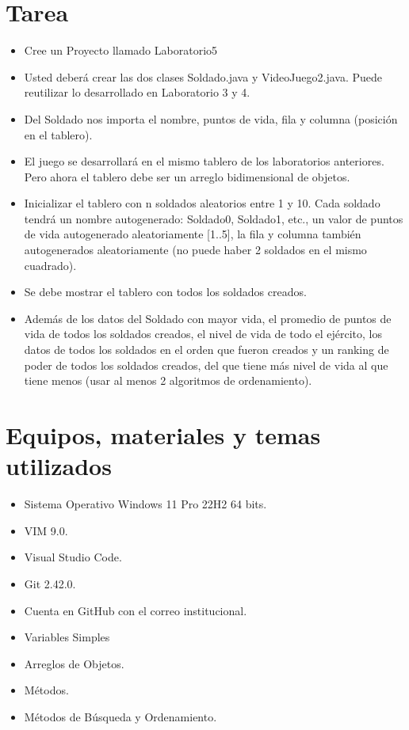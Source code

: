 \documentclass{article}
\begin{document}

	\section{Tarea}
	\begin{itemize}		
		\item Cree un Proyecto llamado Laboratorio5
        \item Usted deberá crear las dos clases Soldado.java y VideoJuego2.java. Puede reutilizar lo desarrollado en Laboratorio 3 y 4.
        \item Del Soldado nos importa el nombre, puntos de vida, fila y columna (posición en el tablero).
        \item El juego se desarrollará en el mismo tablero de los laboratorios anteriores. Pero ahora el tablero debe ser un arreglo bidimensional de objetos.
        \item Inicializar el tablero con n soldados aleatorios entre 1 y 10. Cada soldado tendrá un nombre autogenerado: Soldado0, Soldado1, etc., un valor de puntos de vida autogenerado aleatoriamente [1..5], la fila y columna también autogenerados aleatoriamente (no puede haber 2 soldados en el mismo cuadrado). 
        \item Se debe mostrar el tablero con todos los soldados creados. 
        \item Además de los datos del Soldado con mayor vida, el promedio de puntos de vida de todos los soldados creados, el nivel de vida de todo el ejército, los datos de todos los soldados en el orden que fueron creados y un ranking de poder de todos los soldados creados, del que tiene más nivel de vida al que tiene menos (usar al menos 2 algoritmos de ordenamiento).

	\end{itemize}
		
	\section{Equipos, materiales y temas utilizados}
	\begin{itemize}
		\item Sistema Operativo Windows 11 Pro 22H2 64 bits.
		\item VIM 9.0.
		\item Visual Studio Code.
		\item Git 2.42.0.
		\item Cuenta en GitHub con el correo institucional.
            \item Variables Simples
		\item Arreglos de Objetos.
        \item Métodos.
        \item Métodos de Búsqueda y Ordenamiento.
	\end{itemize}
	
\end{document}
